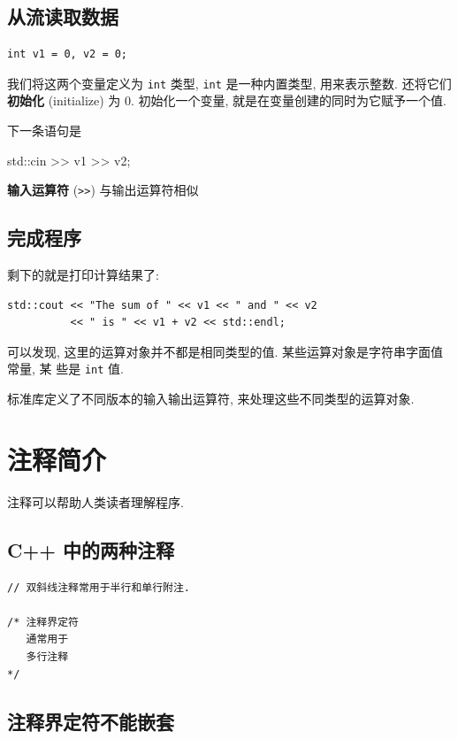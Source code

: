 \documentclass[lang=cn]{elegantbook}
\begin{document}
\subsection{从流读取数据}
\label{sec:org8651fa9}

\begin{verbatim}
int v1 = 0, v2 = 0;
\end{verbatim}

我们将这两个变量定义为 \texttt{int} 类型, \texttt{int} 是一种内置类型, 用来表示整数. 还将它们
\textbf{初始化} (initialize) 为 0. 初始化一个变量, 就是在变量创建的同时为它赋予一个值.

下一条语句是

std::cin >> v1 >> v2;

\textbf{输入运算符} (\texttt{>>}) 与输出运算符相似

\subsection{完成程序}
\label{sec:org78bb4cc}

剩下的就是打印计算结果了:

\begin{verbatim}
std::cout << "The sum of " << v1 << " and " << v2
          << " is " << v1 + v2 << std::endl;
\end{verbatim}

可以发现, 这里的运算对象并不都是相同类型的值. 某些运算对象是字符串字面值常量, 某
些是 \texttt{int} 值.

标准库定义了不同版本的输入输出运算符, 来处理这些不同类型的运算对象.

\section{注释简介}
\label{sec:orgc9def65}

注释可以帮助人类读者理解程序.

\subsection{C++ 中的两种注释}
\label{sec:org5cb42e9}

\begin{verbatim}
// 双斜线注释常用于半行和单行附注.

/* 注释界定符
   通常用于
   多行注释
*/
\end{verbatim}

\subsection{注释界定符不能嵌套}
\label{sec:orgd0982af}
\end{document}
